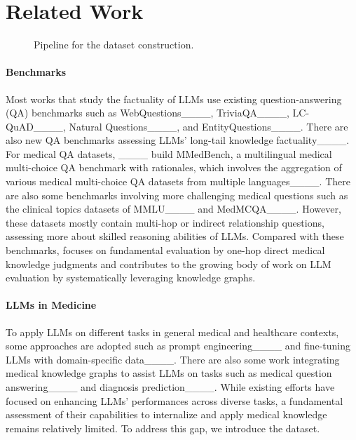 \section{Related Work}
\begin{figure*}[!ht]
    \centering
    \vspace{-1em}
    \caption{Pipeline for the \mkj dataset construction.}
    \label{fig:pipeline}
    \vspace{-1em}
\end{figure*}


\paragraph{Benchmarks} Most works that study the factuality of LLMs use existing question-answering (QA) benchmarks such as WebQuestions____, TriviaQA____, LC-QuAD____, Natural Questions____, and EntityQuestions____. 
There are also new QA benchmarks assessing LLMs' long-tail knowledge factuality____. 
For medical QA datasets, ____ build MMedBench, a multilingual medical multi-choice QA benchmark with rationales, which involves the aggregation of various medical multi-choice QA datasets from multiple languages____. 
There are also some benchmarks involving more challenging medical questions such as the clinical topics datasets of MMLU____ and MedMCQA____. However, these datasets mostly contain multi-hop or indirect relationship questions, assessing more about skilled reasoning abilities of LLMs.
Compared with these benchmarks, \mkj{} focuses on fundamental evaluation by one-hop direct medical knowledge judgments and contributes to the growing body of work on LLM evaluation by systematically leveraging knowledge graphs.




\paragraph{LLMs in Medicine}
To apply LLMs on different tasks in general medical and healthcare contexts, some approaches are adopted such as prompt engineering____ and fine-tuning LLMs with domain-specific data____.
There are also some work integrating medical knowledge graphs to assist LLMs on tasks such as medical question answering____ and diagnosis prediction____.
While existing efforts have focused on enhancing LLMs' performances across diverse tasks, a fundamental assessment of their capabilities to internalize and apply medical knowledge remains relatively limited. To address this gap, we introduce the \mkj dataset.
